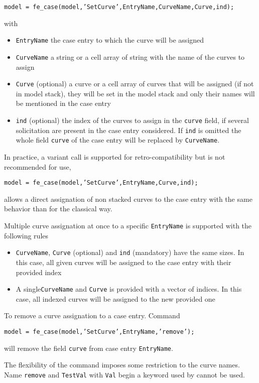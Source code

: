 {\tt model = fe\_case(model,'SetCurve',EntryName,CurveName,Curve,ind);}

with
\begin{itemize}
\item {\tt EntryName} the case entry to which the curve will be assigned
\item {\tt CurveName} a string or a cell array of string with the name of the curves to assign
\item {\tt Curve} (optional)  a curve or a cell array of curves that will be assigned (if not in model stack), they will be set in the model stack and only their names will be mentioned in the case entry
\item {\tt ind} (optional) the index of the curves to assign in the {\tt curve} field, if several solicitation are present in the case entry considered. If {\tt ind} is omitted the whole field {\tt curve} of the case entry will be replaced by {\tt CurveName}.
\end{itemize}

In practice, a variant call is supported for retro-compatibility but is not recommended for use,

{\tt model = fe\_case(model,'SetCurve',EntryName,Curve,ind);}

allows a direct assignation of non stacked curves to the case entry with the same behavior than for the classical way.

\vs

Multiple curve assignation at once to a specific {\tt EntryName} is supported with the following rules
\begin{itemize}
\item {\tt CurveName}, {\tt Curve} (optional) and {\tt ind} (mandatory) have the same sizes. In this case, all given curves will be assigned to the case entry with their provided index
\item A single{\tt CurveName} and {\tt Curve} is provided with a vector of indices. In this case, all indexed curves will be assigned to the new provided one
\end{itemize}

\vs

To remove a curve assignation to a case entry. Command

{\tt model = fe\_case(model,'SetCurve',EntryName,'remove');}

will remove the field {\tt curve} from case entry {\tt EntryName}.


\vs The flexibility of the command imposes some restriction to the curve names. Name {\tt remove} and {\tt TestVal} with {\tt Val} begin a keyword used by  cannot be used.

